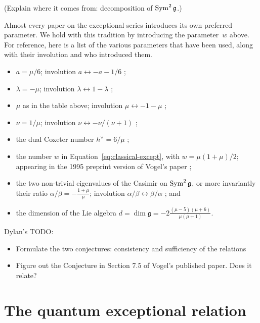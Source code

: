 \documentclass[12pt]{amsart}
\begin{document}
(Explain where it comes from: decomposition of $\operatorname{Sym}^2{\mathfrak g}$.)

\begin{remark}
  Almost every paper on the exceptional series introduces its own
  preferred parameter. We hold with this tradition by introducing the
  parameter~$w$ above. For reference, here is a list of the various
  parameters that have been used, along with their involution and who
  introduced them.
  \begin{itemize}
  \item $a = \mu/6$; involution $a \leftrightarrow -a-1/6$ \cite{MR1378507};
  \item $\lambda = -\mu$; involution $\lambda \leftrightarrow 1-\lambda$ \cite{MR1378507};
  \item $\mu$ as in the table above; involution $\mu \leftrightarrow -1-\mu$ \cite{MR1411045};
  \item $\nu = 1/\mu$; involution $\nu \leftrightarrow -\nu/(\nu+1)$
    \cite{MR1952563};
  \item the dual Coxeter number $h^\vee = 6/\mu$
    \cite{MR1952563};
  \item the number $w$ in Equation~\eqref{eq:classical-except}, with
    $w=\mu(1+\mu)/2$; appearing in the 1995 preprint
    version of Vogel's paper \cite{MR2769234};
  \item the two non-trivial eigenvalues of the Casimir on $\operatorname{Sym}^2
    {\mathfrak g}$, or more invariantly their ratio $\alpha/\beta =
    -\frac{1+\mu}{\mu}$; involution $\alpha/\beta \leftrightarrow
    \beta/\alpha$ \cite{MR2769234}; and
  \item the dimension of the Lie algebra $d = \dim \mathfrak{g} =
    -2\frac{(\mu-5)(\mu+6)}{\mu(\mu+1)}$.
  \end{itemize}
\end{remark}

Dylan's TODO:
\begin{itemize}
\item Formulate the two conjectures: consistency and sufficiency of
  the relations
\item Figure out the Conjecture in Section 7.5 of Vogel's published
  paper. Does it relate?
\end{itemize}

\section{The quantum exceptional relation}
\label{sec:relation}
\end{document}
